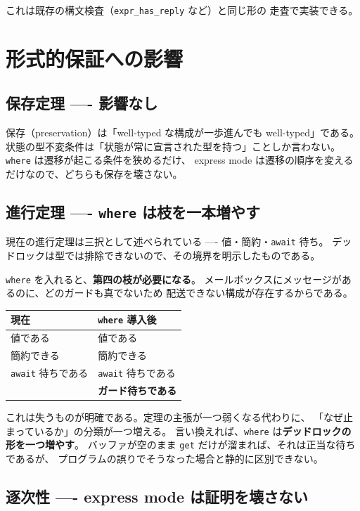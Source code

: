 \documentclass[11pt,a4paper]{ltjsarticle}
\theoremstyle{remark}
\begin{document}
これは既存の構文検査（\texttt{expr\_has\_reply} など）と同じ形の
走査で実装できる。

\section{形式的保証への影響}

\subsection{保存定理 ---- 影響なし}

保存（preservation）は「well-typed な構成が一歩進んでも well-typed」である。
状態の型不変条件は「状態が常に宣言された型を持つ」ことしか言わない。
\texttt{where} は遷移が起こる条件を狭めるだけ、
express mode は遷移の順序を変えるだけなので、どちらも保存を壊さない。

\subsection{進行定理 ---- \texttt{where} は枝を一本増やす}

現在の進行定理は三択として述べられている ---- 値・簡約・\texttt{await} 待ち。
デッドロックは型では排除できないので、その境界を明示したものである。

\texttt{where} を入れると、\textbf{第四の枝が必要になる}。
メールボックスにメッセージがあるのに、どのガードも真でないため
配送できない構成が存在するからである。

\begin{center}
\begin{tabular}{@{}ll@{}}
\toprule
現在 & \texttt{where} 導入後 \\
\midrule
値である & 値である \\
簡約できる & 簡約できる \\
\texttt{await} 待ちである & \texttt{await} 待ちである \\
 & \textbf{ガード待ちである} \\
\bottomrule
\end{tabular}
\end{center}

これは失うものが明確である。定理の主張が一つ弱くなる代わりに、
「なぜ止まっているか」の分類が一つ増える。
言い換えれば、\texttt{where} は\textbf{デッドロックの形を一つ増やす}。
バッファが空のまま \texttt{get} だけが溜まれば、それは正当な待ちであるが、
プログラムの誤りでそうなった場合と静的に区別できない。

\subsection{逐次性 ---- express mode は証明を壊さない}
\end{document}
